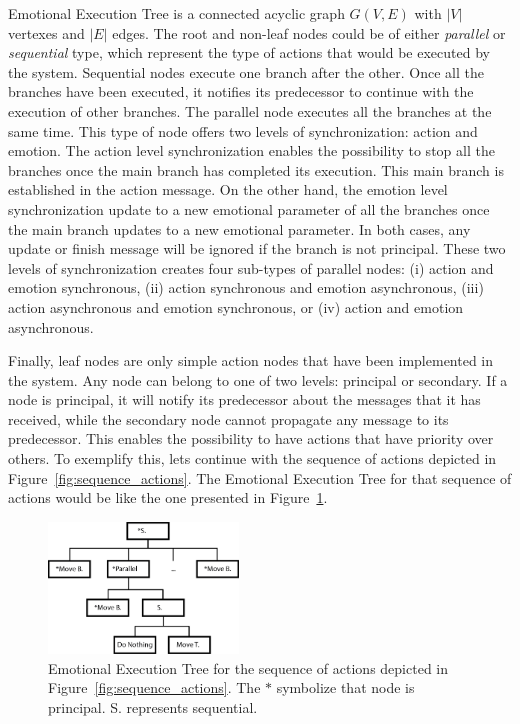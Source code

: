 Emotional Execution Tree is a connected acyclic graph $G(V,E)$ with $|V|$ vertexes and $|E|$ edges. The root and non-leaf nodes could be of either \textit{parallel} or \textit{sequential} type, which represent the type of actions that would be executed by the system. Sequential nodes execute one branch after the other. Once all the branches have been executed, it notifies its predecessor to continue with the execution of other branches. The parallel node executes all the branches at the same time. This type of node offers two levels of synchronization: action and emotion. The action level synchronization enables the possibility to stop all the branches once the main branch has completed its execution. This main branch is established in the action message. On the other hand, the emotion level synchronization update to a new emotional parameter of all the branches once the main branch updates to a  new emotional parameter. In both cases, any update or finish message will be ignored if the branch is not principal. These two levels of synchronization creates four sub-types of parallel nodes: (i) action and emotion synchronous, (ii) action synchronous and emotion asynchronous, (iii) action asynchronous and emotion synchronous, or (iv) action and emotion asynchronous. 
 
Finally, leaf nodes are only simple action nodes that have been implemented in the system. Any node can belong to one of two levels: principal or secondary. If a node is principal, it will notify its predecessor about the messages that it has received, while the secondary node cannot propagate any message to its predecessor. This enables the possibility to have actions that have priority over others. To exemplify this, lets continue with the sequence of actions depicted in Figure~\ref{fig:sequence_actions}. The Emotional Execution Tree for that sequence of actions would be like the one presented in Figure~\ref{fig:emotional_enrichment}.

\begin{figure}
	\centering
	\includegraphics[width=0.45\textwidth]{./Images/Representation.png}
	\caption{Emotional Execution Tree for the sequence of actions depicted in Figure~\ref{fig:sequence_actions}. The $*$ symbolize that node is principal. S. represents sequential.}
	\label{fig:emotional_enrichment}
\end{figure}


